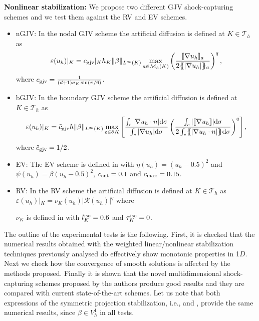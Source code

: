 \begin{algorithm}[Hhtbp]
{\bf Nonlinear stabilization:} We propose two different GJV shock-capturing schemes and we test them against the RV and EV schemes.
\setlength{\leftmargini}{0pt}
\begin{itemize}
\item nGJV: In the nodal GJV scheme the artificial diffusion is defined at $K \in \mathcal{T}_h$ as
\begin{align*}%
\varepsilon(u_h)|_K = c_{\rm gjv}|_K h_K \|\beta\|_{L^\infty(K)} \max_{a \in \setnodes(K)}\left(\frac{ \jump{\nabla u_h}_a }{2\mean{|\nabla u_h|}_a}\right)^q,
\end{align*}
where $c_{\rm gjv} = \frac{1}{(d+1) \sigma_K \sin (\pi/6)}$. %
\item bGJV: In the boundary GJV scheme the artificial diffusion is defined at $K \in \mathcal{T}_h$ as
\begin{align*}%
\varepsilon(u_h)|_K = \tilde c_{\rm gjv} h \|\beta\|_{L^\infty(K)} \max_{e \in \partial K}\left[\frac{\int_e |\nabla u_h \cdot n|{\rm d} \sigma}{\int_e |\nabla u_h| {\rm d} \sigma}\left(\frac{\int_e  | \jump{\nabla u_h}|{\rm d} \sigma }{ 2 \int_e \mean{|\nabla u_h \cdot n|} {\rm d} \sigma}\right)^q\right],
\end{align*}
where $\tilde c_{\rm gjv} = 1/2$.
\item EV: The EV scheme is defined in  with $\eta(u_h) = (u_h-0.5)^2$ and $\psi(u_h) = \beta(u_h-0.5)^2$, $c_{\rm ent} = 0.1$ and $c_{\rm max}=0.15$. 
\item RV: In the RV  scheme the artificial diffusion is defined at $K \in \mathcal{T}_h$ as $\varepsilon(u_h)|_K = \nu_K(u_h) |\mathcal{R}(u_h)|^q$ where

 $\nu_K$ is defined in  with $l_K^{\rm iso}=0.6$ and $\tau_K^{\rm iso}=0$.
\end{itemize}
\caption{Possible combination of linear stabilization and shock-capturing\label{alg-wNPS-GJV}}
\end{algorithm}

The outline of the experimental tests is the following. First, it is checked that the numerical results obtained with the weighted linear/nonlinear stabilization techniques previously analysed do effectively show monotonic properties in 1$D$. Next we check how the convergence of smooth solutions is affected by the methods proposed.  Finally it is shown that the novel multidimensional shock-capturing schemes proposed by the authors produce good results and they are compared with current state-of-the-art schemes. Let us note that both expressions of the symmetric projection stabilization, i.e.,  and , provide the same numerical results, since $\beta  \in V_h^1$ in all tests.

